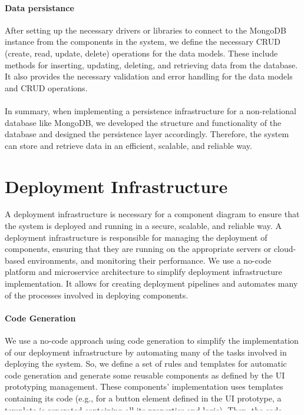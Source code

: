 \paragraph{Data persistance}
After setting up the necessary drivers or libraries to connect to the MongoDB instance from the components in the system, we define the necessary CRUD (create, read, update, delete) operations for the data models.
These include methods for inserting, updating, deleting, and retrieving data from the database. 
It also provides the necessary validation and error handling for the data models and CRUD operations.\\\\
In summary, when implementing a persistence infrastructure for a non-relational database like MongoDB, we developed the structure and functionality of the database and designed the persistence layer accordingly. 
Therefore, the system can store and retrieve data in an efficient, scalable, and reliable way.

\clearpage
\section{Deployment Infrastructure}
\label{sc:section:deployment}
A deployment infrastructure is necessary for a component diagram to ensure that the system is deployed and running in a secure, scalable, and reliable way. 
A deployment infrastructure is responsible for managing the deployment of components, ensuring that they are running on the appropriate servers or cloud-based environments, and monitoring their performance.
We use a no-code platform and microservice architecture to simplify deployment infrastructure implementation. It allows for creating deployment pipelines and automates many of the processes involved in deploying components.

\paragraph{Code Generation}
We use a no-code approach using code generation to simplify the implementation of our deployment infrastructure by automating many of the tasks involved in deploying the system.
So, we define a set of rules and templates for automatic code generation and generate some reusable components as defined by the UI prototyping management. 
These components' implementation uses templates containing its code (e.g., for a button element defined in the UI prototype, a template is generated containing all its properties and logic).
Then, the code generator takes input data, including configuration files, database schemas, and models of system components and their interactions. 
Finally, the code will be generated using the templates and rules defined in the previous steps, and we will containerize the generated code. 

